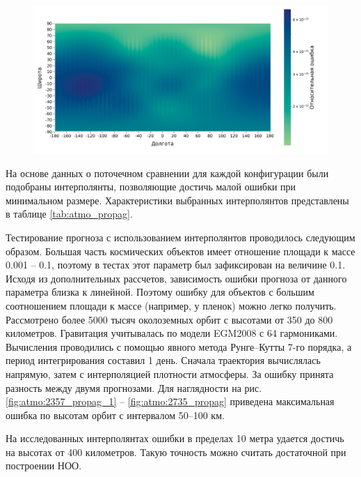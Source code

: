  \begin{figure}[h!]
    \centering
    \includegraphics[width=\linewidth]{../images/solution/atmo/2753_latlon_abs_error_heatmap.png}
    \label{fig:atmo:2753_latlon_abs_err}
 \end{figure}

 На основе данных о поточечном сравнении для каждой конфигурации были подобраны интерполянты, 
 позволяющие достичь малой ошибки при минимальном размере. 
 Характеристики выбранных интерполянтов представлены в таблице \ref{tab:atmo_propag}.

 Тестирование прогноза с использованием интерполянтов проводилось следующим образом.
 Большая часть космических объектов имеет отношение площади к массе 0.001 -- 0.1,
 поэтому в тестах этот параметр был зафиксирован на величине 0.1. Исходя из дополнительных
 рассчетов, зависимость ошибки прогноза от данного параметра близка к линейной. Поэтому
 ошибку для объектов с большим соотношением площади к массе (например, у пленок) 
 можно легко получить.
 Рассмотрено более 5000 тысяч околоземных орбит с высотами от 350 до 800 километров. 
 Гравитация учитывалась по модели EGM2008 с 64 гармониками. Вычисления проводились
 с помощью явного метода Рунге--Кутты 7-го порядка, а период интегрирования составил 1 день.
 Сначала траектория вычислялась напрямую, затем с интерполяцией плотности атмосферы.
 За ошибку принята разность между двумя прогнозами. Для наглядности на рис. 
 \ref{fig:atmo:2357_propag_1} -- \ref{fig:atmo:2735_propag}
 приведена максимальная ошибка по высотам орбит с интервалом 50--100 км.

 На исследованных интерполянтах ошибки в пределах 10 метра удается достичь на высотах
 от 400 километров. Такую точность можно считать достаточной при построении НОО.

